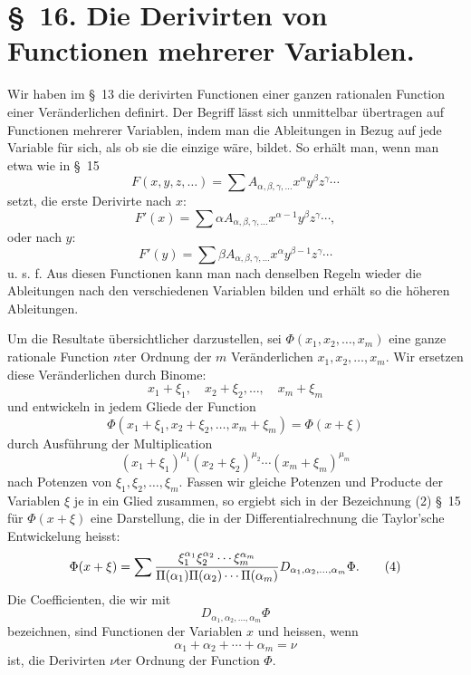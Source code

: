 \documentclass[11pt]{article}
\begin{document}
\section*{\S~16. Die Derivirten von Functionen mehrerer Variablen.}

Wir haben im \S~13 die derivirten Functionen einer ganzen rationalen Function einer Veränderlichen definirt. Der Begriff lässt sich unmittelbar übertragen auf Functionen mehrerer Variablen, indem man die Ableitungen in Bezug auf jede Variable für sich, als ob sie die einzige wäre, bildet. So erhält man, wenn man etwa wie in \S~15
\begin{equation}
 F(x,y,z,\ldots)=\sum A_{\alpha,\beta,\gamma,\ldots}x^\alpha y^\beta z^\gamma\cdots
\tag{1}
\end{equation}
setzt, die erste Derivirte nach $x$:
\begin{equation}
 F'(x)=\sum \alpha A_{\alpha,\beta,\gamma,\ldots}x^{\alpha-1}y^\beta z^\gamma\cdots,
\tag{2}
\end{equation}
oder nach $y$:
\begin{equation}
 F'(y)=\sum \beta A_{\alpha,\beta,\gamma,\ldots}x^\alpha y^{\beta-1}z^\gamma\cdots
\tag{3}
\end{equation}
u. s. f. Aus diesen Functionen kann man nach denselben Regeln wieder die Ableitungen nach den verschiedenen Variablen bilden und erhält so die höheren Ableitungen.

Um die Resultate übersichtlicher darzustellen, sei $\Phi(x_1,x_2,\ldots,x_m)$ eine ganze rationale Function $n$ter Ordnung der $m$ Veränderlichen $x_1,x_2,\ldots,x_m$. Wir ersetzen diese Veränderlichen durch Binome:
\[
 x_1+\xi_1,\quad x_2+\xi_2,\ldots,\quad x_m+\xi_m
\]
und entwickeln in jedem Gliede der Function
\[
 \Phi(x_1+\xi_1,x_2+\xi_2,\ldots,x_m+\xi_m)=\Phi(x+\xi)
\]
durch Ausführung der Multiplication
\[
 (x_1+\xi_1)^{\mu_1}(x_2+\xi_2)^{\mu_2}\cdots(x_m+\xi_m)^{\mu_m}
\]
nach Potenzen von $\xi_1,\xi_2,\ldots,\xi_m$. Fassen wir gleiche Potenzen und Producte der Variablen $\xi$ je in ein Glied zusammen, so ergiebt sich in der Bezeichnung (2) \S~15 für $\Phi(x+\xi)$ eine Darstellung, die in der Differentialrechnung die Taylor'sche Entwickelung heisst:
\begin{equation}
 \Phi(x+\xi)=\sum
 {\xi_1^{\alpha_1}\xi_2^{\alpha_2}\cdots\xi_m^{\alpha_m}
 \over \Pi(\alpha_1)\Pi(\alpha_2)\cdots\Pi(\alpha_m)}
 D_{\alpha_1,\alpha_2,\ldots,\alpha_m}\Phi .
\tag{4}
\end{equation}
Die Coefficienten, die wir mit
\[
 D_{\alpha_1,\alpha_2,\ldots,\alpha_m}\Phi
\]
bezeichnen, sind Functionen der Variablen $x$ und heissen, wenn
\[
 \alpha_1+\alpha_2+\cdots+\alpha_m=\nu
\]
ist, die Derivirten $\nu$ter Ordnung der Function $\Phi$.
\end{document}
